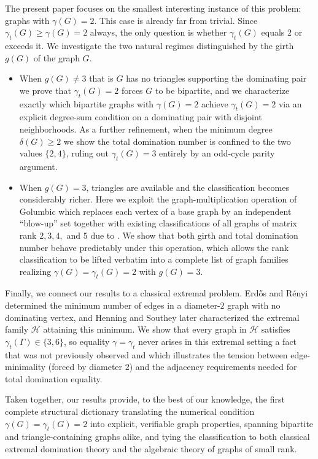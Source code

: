\documentclass[12pt]{amsart}
\theoremstyle{plain}
\theoremstyle{definition}
\begin{document}
The present paper focuses on the smallest interesting instance of this problem: graphs with $\gamma(G)=2$. This case is already far from trivial. Since $\gamma_t(G)\ge \gamma(G)=2$ always, the only question is whether $\gamma_t(G)$ equals $2$ or exceeds it. 
We investigate the two natural regimes distinguished by the girth $g(G)$ of the graph $G$.

\begin{itemize}
\item When $g(G) \ne 3$ that is $G$ has no triangles supporting the dominating pair we prove that $\gamma_t(G)=2$ forces $G$ to be bipartite, and we characterize exactly which bipartite graphs with $\gamma(G)=2$ achieve $\gamma_t(G)=2$ via an explicit degree-sum condition on a dominating pair with disjoint neighborhoods. As a further refinement, when the minimum degree $\delta(G) \ge 2$ we show the total domination number is confined to the two values $\{2,4\}$, ruling out $\gamma_t(G)=3$ entirely by an odd-cycle parity argument.

\item When $g(G)=3$, triangles are available and the classification becomes considerably richer. Here we exploit the graph-multiplication operation of Golumbic \cite{Graph-multiplication-Golumbic} which replaces each vertex of a base graph by an independent ``blow-up'' set together with existing classifications of all graphs of matrix rank $2, 3, 4,$ and $5$ due to \cite{Rank-4-graph-LAA,LAA-rank-5-graph-charecterization,Nulity-of-graphs-ELA}. We show that both girth and total domination number behave predictably under this operation, which allows the rank classification to be lifted verbatim into a complete list of graph families realizing $\gamma(G)=\gamma_t(G)=2$ with $g(G)=3$.
\end{itemize}

Finally, we connect our results to a classical extremal problem. Erd\H{o}s and R\'{e}nyi \cite{ERDOS-RENYEL} determined the minimum number of edges in a diameter-$2$ graph with no dominating vertex, and Henning and Southey \cite{Henning-Michael} later characterized the extremal family $\mathcal{H}$ attaining this minimum. We show that every graph in $\mathcal{H}$ satisfies $\gamma_t(\Gamma) \in \{3,6\}$, so equality $\gamma=\gamma_t$ never arises in this extremal setting a fact that was not previously observed and which illustrates the tension between edge-minimality (forced by diameter $2$) and the adjacency requirements needed for total domination equality.

Taken together, our results provide, to the best of our knowledge, the first complete structural dictionary translating the numerical condition $\gamma(G)=\gamma_t(G)=2$ into explicit, verifiable graph properties, spanning bipartite and triangle-containing graphs alike, and tying the classification to both classical extremal domination theory and the algebraic theory of graphs of small rank.
\end{document}
